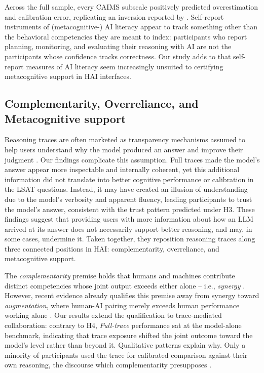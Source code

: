 \documentclass[manuscript, anonymous=false,authorversion,review=false]{acmart}
\begin{document}
Across the full sample, every CAIMS subscale positively predicted overestimation and calibration error, replicating an inversion reported by \citet{FERNANDES2026108779}. Self-report instruments of (metacognitive-) AI literacy appear to track something other than the behavioral competencies they are meant to index: participants who report planning, monitoring, and evaluating their reasoning with AI are not the participants whose confidence tracks correctness. Our study adds to \citet{FERNANDES2026108779} that self-report measures of AI literacy seem increasingly unsuited to certifying metacognitive support in HAI interfaces.

\subsection{Complementarity, Overreliance, and Metacognitive support}
Reasoning traces are often marketed as transparency mechanisms assumed to help users understand why the model produced an answer and improve their judgment \cite{openai2024learning,openai2025monitorability,anthropic2025extended,anthropic2025think}. Our findings complicate this assumption. Full traces made the model's answer appear more inspectable and internally coherent, yet this additional information did not translate into better cognitive performance or calibration in the LSAT questions. Instead, it may have created an illusion of understanding \cite{fisher2021harder} due to the model's verbosity and apparent fluency, leading participants to trust the model's answer, consistent with the trust pattern predicted under H3.
These findings suggest that providing users with more information about how an LLM arrived at its answer does not necessarily support better reasoning, and may, in some cases, undermine it. Taken together, they reposition reasoning traces along three connected positions in HAI: complementarity, overreliance, and metacognitive support.

The \textit{complementarity} premise holds that humans and machines contribute distinct competencies whose joint output exceeds either alone -- i.e., \textit{synergy} \cite{vaccaro2024combinations}. However, recent evidence already qualifies this premise away from synergy toward \textit{augmentation}, where human-AI pairing merely exceeds human performance working alone \cite{vaccaro2024combinations,FERNANDES2026108779}. Our results extend the qualification to trace-mediated collaboration: contrary to H4, \textit{Full-trace} performance sat at the model-alone benchmark, indicating that trace exposure shifted the joint outcome toward the model's level rather than beyond it.  Qualitative patterns explain why. Only a minority of participants used the trace for calibrated comparison against their own reasoning, the discourse which complementarity presupposes \cite{FERNANDES2026108779}.%
\end{document}

